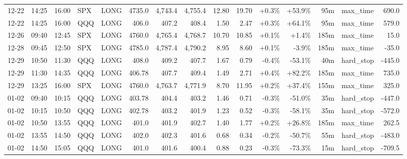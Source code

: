 \documentclass[11pt,a4paper,twoside]{article}
\begin{document}
\begin{landscape}
\begin{center}
\begin{longtable}{>{\color{txtmain}}l l l l l r r r r r r r r >{\color{txtmain}}l r}
12-22 & 14:25 & 16:00 & SPX & LONG & 4735.0 & 4,743.4 & 4,755.4 & 12.80 & 19.70 & \textcolor{wingreen}{+0.3\%} & \textcolor{wingreen}{+53.9\%} & 95m & max\_time & \textcolor{wingreen}{690.0} \\
12-22 & 14:25 & 16:00 & QQQ & LONG & 406.0 & 407.2 & 408.4 & 1.50 & 2.47 & \textcolor{wingreen}{+0.3\%} & \textcolor{wingreen}{+64.1\%} & 95m & max\_time & \textcolor{wingreen}{579.0} \\
12-26 & 09:40 & 12:45 & SPX & LONG & 4760.0 & 4,765.4 & 4,768.7 & 10.70 & 10.85 & \textcolor{wingreen}{+0.1\%} & \textcolor{wingreen}{+1.4\%} & 185m & max\_time & \textcolor{wingreen}{15.0} \\
12-28 & 09:45 & 12:50 & SPX & LONG & 4785.0 & 4,787.4 & 4,790.2 & 8.95 & 8.60 & \textcolor{wingreen}{+0.1\%} & \textcolor{lossred}{-3.9\%} & 185m & max\_time & \textcolor{lossred}{-35.0} \\
12-29 & 10:50 & 11:30 & QQQ & LONG & 408.0 & 409.2 & 407.7 & 1.67 & 0.79 & \textcolor{lossred}{-0.4\%} & \textcolor{lossred}{-53.1\%} & 40m & hard\_stop & \textcolor{lossred}{-445.0} \\
12-29 & 11:30 & 14:35 & QQQ & LONG & 406.78 & 407.7 & 409.4 & 1.49 & 2.71 & \textcolor{wingreen}{+0.4\%} & \textcolor{wingreen}{+82.2\%} & 185m & max\_time & \textcolor{wingreen}{735.0} \\
12-29 & 13:25 & 16:00 & SPX & LONG & 4760.0 & 4,763.7 & 4,771.9 & 8.70 & 11.95 & \textcolor{wingreen}{+0.2\%} & \textcolor{wingreen}{+37.4\%} & 155m & max\_time & \textcolor{wingreen}{325.0} \\
01-02 & 09:40 & 10:15 & QQQ & LONG & 403.78 & 404.4 & 403.2 & 1.46 & 0.71 & \textcolor{lossred}{-0.3\%} & \textcolor{lossred}{-51.0\%} & 35m & hard\_stop & \textcolor{lossred}{-447.0} \\
01-02 & 10:15 & 10:50 & QQQ & LONG & 402.78 & 403.2 & 401.9 & 1.23 & 0.52 & \textcolor{lossred}{-0.3\%} & \textcolor{lossred}{-58.1\%} & 35m & hard\_stop & \textcolor{lossred}{-572.0} \\
01-02 & 10:50 & 13:55 & QQQ & LONG & 401.0 & 401.9 & 402.7 & 1.40 & 1.77 & \textcolor{wingreen}{+0.2\%} & \textcolor{wingreen}{+26.8\%} & 185m & max\_time & \textcolor{wingreen}{262.5} \\
01-02 & 13:55 & 14:50 & QQQ & LONG & 402.0 & 402.3 & 401.6 & 0.68 & 0.34 & \textcolor{lossred}{-0.2\%} & \textcolor{lossred}{-50.7\%} & 55m & hard\_stop & \textcolor{lossred}{-483.0} \\
01-02 & 14:50 & 15:05 & QQQ & LONG & 401.0 & 401.6 & 400.4 & 0.88 & 0.23 & \textcolor{lossred}{-0.3\%} & \textcolor{lossred}{-73.3\%} & 15m & hard\_stop & \textcolor{lossred}{-709.5} \\

\end{longtable}
\end{center}
\end{landscape}
\end{document}
